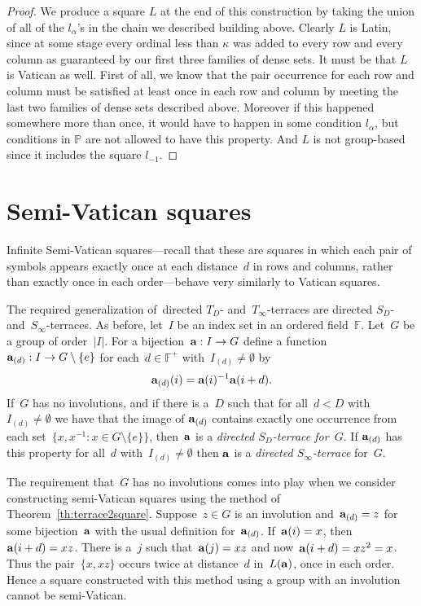 \documentclass[12pt,a4paper]{article}
\newcommand{\F}{\mathbb{F}}
\renewcommand{\P}{\mathbb{P}}
\begin{document}
\begin{proof}
We produce a square $L$ at the end of this construction by taking the union of all of the $l_\alpha$'s in the chain we described building above. Clearly $L$ is Latin, since at some stage every ordinal less than $\kappa$ was added to every row and every column as guaranteed by our first three families of dense sets. It must be that $L$ is Vatican as well. First of all, we know that the pair occurrence for each row and column must be satisfied at least once in each row and column by meeting the last two families of dense sets described above. Moreover if this happened somewhere more than once, it would have to happen in some condition $l_\alpha$, but conditions in $\P$ are not allowed to have this property. And $L$ is not
group-based since it includes the square $l_{-1}$.
\end{proof}


\section{Semi-Vatican squares}\label{sec:semivat}

Infinite Semi-Vatican squares---recall that these are squares in which each pair of symbols appears exactly once at each distance~$d$ in rows and columns, rather than exactly once in each order---behave very similarly to Vatican squares.  

The required generalization of~directed $T_{D}$- and~$T_{\infty}$-terraces are directed $S_{D}$- and~$S_{\infty}$-terraces.  As before, let~$I$ be an index set in an ordered field~$\F$.  Let~$G$ be a group of order~$|I|$.  For a bijection~${\bf a}: I \rightarrow G$ define a function~${\bf a}_{(d)}: I \rightarrow G \setminus \{ e \}$ for each~$d \in \F^+$ with~$I_{(d)} \neq \emptyset$ by
$${\bf a}_{(d)}(i) = {\bf a}(i)^{-1}{\bf a}(i+d).$$
If~$G$ has no involutions, and if there is a~$D$ such that for all~$d < D$ with~$I_{(d)} \neq \emptyset$ we have that the image of ${\bf a}_{(d)}$ contains exactly one occurrence from each set~$\{ x,x^{-1} : x \in G\setminus \{e\} \}$, then~${\bf a}$ is a {\em directed $S_D$-terrace for~$G$}.  If ${\bf a}_{(d)}$ has this property for all~$d$ with~$I_{(d)} \neq \emptyset$ then ${\bf a}$ is  a {\em directed $S_{\infty}$-terrace} for~$G$.

The requirement that~$G$ has no involutions comes into play when we consider constructing semi-Vatican squares using the method of Theorem~\ref{th:terrace2square}.  Suppose~$z \in G$ is an involution and~${\bf a}_{(d)} = z$ for some bijection~${\bf a}$ with the usual definition for~${\bf a}_{(d)}$.  If~${\bf a}(i) = x$, then ${\bf a}(i+d) = xz$.  There is a~$j$ such that~${\bf a}(j) = xz$ and now~${\bf a}(i+d) = xz^2 = x$.  Thus the pair~$\{ x, xz \}$ occurs twice at distance~$d$ in~$L({\bf a})$, once in each order.  Hence a square constructed with this method using a group with an involution cannot be semi-Vatican.
\end{document}

